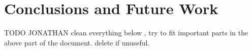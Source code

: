 \chapter{Conclusions and Future Work}

 {\color{red}TODO JONATHAN clean everything below , try to fit important parts in the above part of the document. delete if unuseful.}
